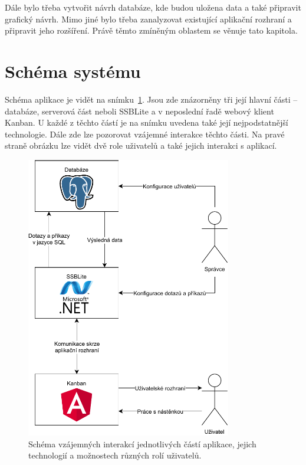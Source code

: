 Dále bylo třeba vytvořit návrh databáze, kde budou uložena data a také připravit grafický návrh. Mimo jiné bylo třeba zanalyzovat existující aplikační rozhraní a připravit jeho rozšíření. 
Právě těmto zmíněným oblastem se věnuje tato kapitola.




\section{Schéma systému}
Schéma aplikace je vidět na snímku~\ref{img:scheme}. Jsou zde znázorněny tři její hlavní části -- databáze, serverová část neboli SSBLite a v neposlední řadě webový klient Kanban. U každé z těchto částí je na snímku uvedena také její nejpodstatnější technologie. Dále zde lze pozorovat vzájemné interakce těchto části. Na pravé straně obrázku lze vidět dvě role uživatelů a také jejich interakci s aplikací.

\begin{figure}[H]
    \label{img:scheme}
	\centering
	\includegraphics[width=0.8\textwidth]{obrazky-figures/app-scheme.pdf}
	\caption{Schéma vzájemných interakcí jednotlivých částí aplikace, jejich technologií a možnostech různých rolí uživatelů.}
\end{figure}

